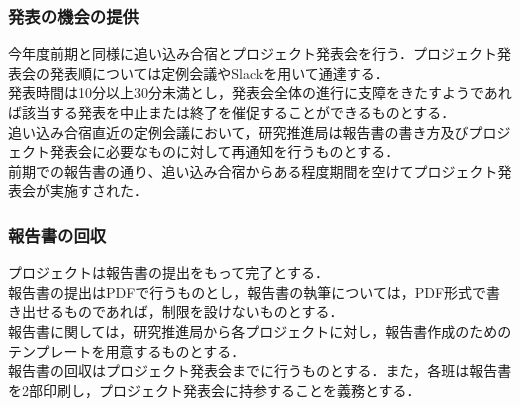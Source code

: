 \subsubsection*{発表の機会の提供}

今年度前期と同様に追い込み合宿とプロジェクト発表会を行う．プロジェクト発表会の発表順については定例会議やSlackを用いて通達する．\\
発表時間は10分以上30分未満とし，発表会全体の進行に支障をきたすようであれば該当する発表を中止または終了を催促することができるものとする．\\
追い込み合宿直近の定例会議において，研究推進局は報告書の書き方及びプロジェクト発表会に必要なものに対して再通知を行うものとする．\\
前期での報告書の通り、追い込み合宿からある程度期間を空けてプロジェクト発表会が実施すされた．\\

\subsubsection*{報告書の回収}

プロジェクトは報告書の提出をもって完了とする．\\
報告書の提出はPDFで行うものとし，報告書の執筆については，PDF形式で書き出せるものであれば，制限を設けないものとする．\\
報告書に関しては，研究推進局から各プロジェクトに対し，報告書作成のためのテンプレートを用意するものとする．\\
報告書の回収はプロジェクト発表会までに行うものとする．また，各班は報告書を2部印刷し，プロジェクト発表会に持参することを義務とする．\\

